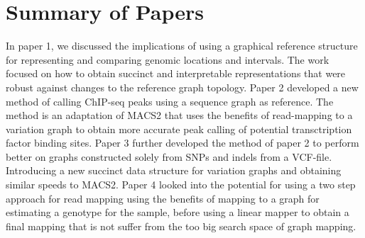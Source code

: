   
\chapter{Summary of Papers}
In paper 1, we discussed the implications of using a graphical reference structure for representing and comparing genomic locations and intervals.
The work focused on how to obtain succinct and interpretable representations that were robust against changes to the reference graph topology. 
Paper 2 developed a new method of calling ChIP-seq peaks using a sequence graph as reference.
The method is an adaptation of MACS2 that uses the benefits of read-mapping to a variation graph to obtain more accurate peak calling of potential transctription factor binding sites. 
Paper 3 further developed the method of paper 2 to perform better on graphs constructed solely from SNPs and indels from a VCF-file. Introducing a new succinct data structure for variation graphs and obtaining similar speeds to MACS2.
Paper 4 looked into the potential for using a two step approach for read mapping using the benefits of mapping to a graph for estimating a genotype for the sample, before using a linear mapper to obtain a final mapping that is not suffer from the too big search space of graph mapping. 


